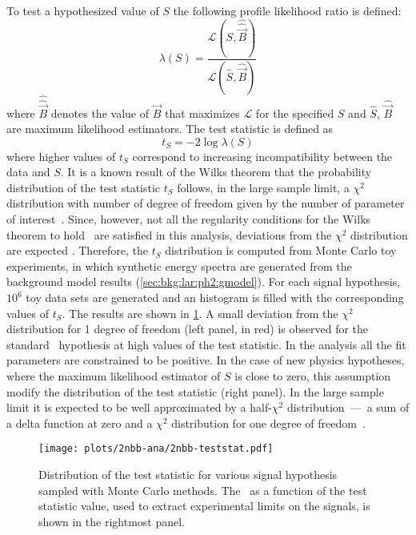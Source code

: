 To test a hypothesized value of $S$ the following profile likelihood ratio is defined:
\[
  \lambda(S) = \frac{\mathcal{L}(S, \hat{\hat{\vec{B}}})}{\mathcal{L}(\hat{S}, \hat{\vec{B}})}
\]
where $\hat{\hat{\vec{B}}}$ denotes the value of $\vec{B}$ that maximizes $\mathcal{L}$
for the specified $S$ and $\hat{S}$, $\hat{\vec{B}}$ are maximum likelihood
estimators. The test statistic is defined as
\[
  t_S = -2\log\lambda(S)
\]
where higher values of $t_S$ correspond to increasing incompatibility between the data and
$S$. It is a known result of the Wilks theorem that the probability distribution of the
test statistic $t_S$ follows, in the large sample limit, a $\chi^2$ distribution with
number of degree of freedom given by the number of parameter of interest~\cite{Cowan2011}.
Since, however, not all the regularity conditions for the Wilks theorem to
hold~\cite{Algeri2020} are satisfied in this analysis, deviations from the $\chi^2$
distribution are expected . Therefore, the $t_S$ distribution is computed
from Monte Carlo toy experiments, in which synthetic energy spectra are generated from the
background model results (\cref{sec:bkg:lar:ph2:gmodel}). For each signal hypothesis,
$10^6$ toy data sets are generated and an histogram is filled with the corresponding
values of $t_S$. The results are shown in \cref{fig:2nbb-ana:ts-dist}. A small deviation
from the $\chi^2$ distribution for 1 degree of freedom (left panel, in red) is observed
for the standard \nnbb\ hypothesis at high values of the test statistic. In the analysis
all the fit parameters are constrained to be positive. In the case of new physics
hypotheses, where the maximum likelihood estimator of $S$ is close to zero, this
assumption modify the distribution of the test statistic (right panel). In the large
sample limit it is expected to be well approximated by a half-$\chi^2$ distribution~---~a
sum of a delta function at zero and a $\chi^2$ distribution for one degree of
freedom~\cite{Cowan2011}.

\begin{figure}
  \centering
  \texttt{[image: plots/2nbb-ana/2nbb-teststat.pdf]}
  \caption{%
    Distribution of the test statistic for various signal hypothesis sampled with Monte
    Carlo methods. The \pvalue\ as a function of the test statistic value, used to extract
    experimental limits on the signals, is shown in the rightmost panel. 
  }\label{fig:2nbb-ana:ts-dist}
\end{figure}

